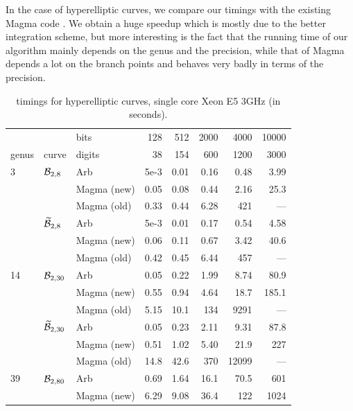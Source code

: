 \documentclass[main.tex]{subfiles}
\begin{document}
  In the case of hyperelliptic curves, we compare our timings with the existing
  Magma code \cite{vanWamelen06}. We obtain a huge speedup which is mostly due
  to the better integration scheme, but more interesting is the fact that the
  running time of our algorithm mainly depends on the genus and the precision,
  while that of Magma depends a lot on the branch points and behaves very badly
  in terms of the precision.

  \begin{table}[H]
      \begin{center}
          \begin{tabular}{lllrrrrr}
              \toprule
              & & \hfill bits & 128 & 512 & 2000 & 4000 & 10000 \\
              genus & curve & \hfill digits & 38 & 154 & 600 & 1200 & 3000 \\
              \midrule
              3 & $\mathcal{B}_{2,8}$
              &   Arb         & 5e-3  & 0.01  & 0.16    & 0.48     & 3.99 \\
              & & Magma (new) & 0.05  & 0.08  & 0.44   & 2.16    & 25.3 \\
              & & Magma (old) & 0.33  & 0.44  & 6.28   & 421  & --- \\
              \cmidrule{3-8}
              & $\widetilde{\mathcal{B}}_{2,8}$
              &   Arb         & 5e-3  & 0.01  & 0.17    & 0.54      & 4.58 \\
              & & Magma (new) & 0.06  & 0.11  & 0.67   & 3.42     & 40.6 \\
              & & Magma (old) & 0.42  & 0.45  & 6.44   & 457   & --- \\
              \midrule
              14 & $\mathcal{B}_{2,30}$
                & Arb         & 0.05  & 0.22   & 1.99    & 8.74     & 80.9 \\
              & & Magma (new) & 0.55  & 0.94  & 4.64   & 18.7   & 185.1 \\
              & & Magma (old) & 5.15  & 10.1 & 134 & 9291 & --- \\
              \cmidrule{3-8}
              & $\widetilde{\mathcal{B}}_{2,30}$
              &   Arb         & 0.05  & 0.23   & 2.11    & 9.31      & 87.8 \\
              & & Magma (new) & 0.51  & 1.02  & 5.40   & 21.9    & 227 \\
              & & Magma (old) & 14.8  & 42.6  & 370 & 12099 & --- \\
              \midrule
              39 & $\mathcal{B}_{2,80}$
              &   Arb         & 0.69 & 1.64   & 16.1   & 70.5    & 601 \\
              & & Magma (new) & 6.29  & 9.08  & 36.4  & 122  & 1024 \\
              \bottomrule
          \end{tabular}
          \caption{timings for hyperelliptic curves, single core Xeon E5 3GHz (in seconds).}
      \end{center}
  \end{table}
\end{document}
